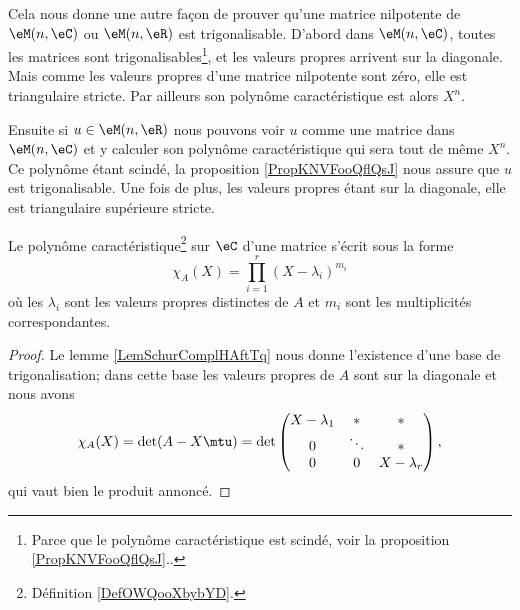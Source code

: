 \begin{remark}  \label{RemREOSooGEDJWX}
    Cela nous donne une autre façon de prouver qu'une matrice nilpotente de \( \eM(n,\eC)\) ou \( \eM(n,\eR)\) est trigonalisable\cite{KDUFooVxwqlC}. D'abord dans \( \eM(n,\eC)\), toutes les matrices sont trigonalisables\footnote{Parce que le polynôme caractéristique est scindé, voir la proposition \ref{PropKNVFooQflQsJ}..}, et les valeurs propres arrivent sur la diagonale. Mais comme les valeurs propres d'une matrice nilpotente sont zéro, elle est triangulaire stricte. Par ailleurs son polynôme caractéristique est alors \( X^n\).

    Ensuite si \( u\in \eM(n,\eR)\) nous pouvons voir \( u\) comme une matrice dans \( \eM(n,\eC)\) et y calculer son polynôme caractéristique qui sera tout de même \( X^n\). Ce polynôme étant scindé, la proposition \ref{PropKNVFooQflQsJ} nous assure que \( u\) est trigonalisable. Une fois de plus, les valeurs propres étant sur la diagonale, elle est triangulaire supérieure stricte.
\end{remark}

\begin{corollary}   \label{CorUNZooAZULXT}
    Le polynôme caractéristique\footnote{Définition \ref{DefOWQooXbybYD}.} sur \( \eC\) d'une matrice s'écrit sous la forme
    \begin{equation}
        \chi_A(X)=\prod_{i=1}^r(X-\lambda_i)^{m_i}
    \end{equation}
    où les \( \lambda_i\) sont les valeurs propres distinctes de \( A\) et \( m_i\) sont les multiplicités correspondantes.
\end{corollary}

\begin{proof}
    Le lemme \ref{LemSchurComplHAftTq} nous donne l'existence d'une base de trigonalisation; dans cette base les valeurs propres de \( A\) sont sur la diagonale et nous avons 
    \begin{equation}
        \chi_A(X)=\det(A-X\mtu)=\det\begin{pmatrix}
            X-\lambda_1    &   *    &   *    \\
            0    &   \ddots    &   *    \\
            0    &   0    &   X-\lambda_r
        \end{pmatrix},
    \end{equation}
    qui vaut bien le produit annoncé.
\end{proof}

